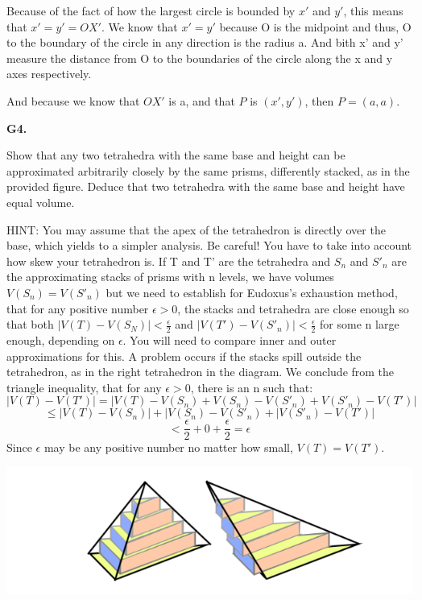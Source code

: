 \documentclass{article}
\begin{document}
Because of the fact of how the largest circle is bounded by $x'$ and $y'$,
this means that $x' = y' = OX'$.
We know that $x' = y'$ because O is the midpoint and thus, O to the boundary
of the circle in any direction is the radius a.
And bith x' and y' measure the distance from O to the boundaries of the circle
along the x and y axes respectively. 

And because we know that $OX'$ is a, and that $P$ is $(x', y')$,
then $P = (a, a)$.


\textbf{G4.}


Show that any two tetrahedra with the same base and height can be approximated arbitrarily closely by the same prisms, differently stacked, as in the provided figure. Deduce that two tetrahedra with the same base and height have equal volume.

HINT: You may assume that the apex of the tetrahedron is directly over the base, which yields to a simpler analysis. Be careful! You have to take into account how skew your tetrahedron is. If T and T' are the tetrahedra and $S_n$ and ${S'}_n$ are the approximating stacks of prisms with n levels, we have volumes $V(S_n) = V({S'}_n)$ but we need to establish for Eudoxus's exhaustion method, that for any positive number $\epsilon > 0$, the stacks and tetrahedra are close enough so that both $|V(T) - V(S_N)| < \frac{\epsilon}{2}$ and $|V(T') - V({S'}_n)| < \frac{\epsilon}{2}$ for some n large enough, depending on $\epsilon$. You will need to compare inner and outer approximations for this. A problem occurs if the stacks spill outside the tetrahedron, as in the right tetrahedron in the diagram. We conclude from the triangle inequality, that for any $\epsilon > 0$, there is an n such that:
\[|V(T) - V(T')| = |V(T) - V(S_n) + V(S_n) - V({S'}_n) + V({S'}_n) - V(T')|\]
\[\leq |V(T) - V(S_n)| + |V(S_n) - V({S'}_n) + |V({S'}_n) - V(T')|\]
\[< \frac{\epsilon}{2} + 0 + \frac{\epsilon}{2} = \epsilon\]
Since $\epsilon$ may be any positive number no matter how small, $V(T) = V(T')$.

\includegraphics[width=\linewidth]{tetrahedra}
\end{document}
